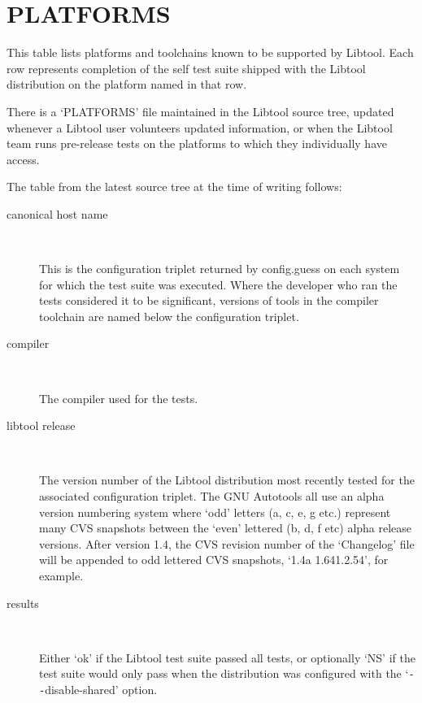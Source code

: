 \chapter{PLATFORMS}\label{platforms}

This table lists platforms and toolchains known to be supported by Libtool. Each row represents completion of the self test suite shipped with the Libtool distribution on the platform named in that row.

There is a `PLATFORMS' file maintained in the Libtool source tree, updated whenever a Libtool user volunteers updated information, or when the Libtool team runs pre-release tests on the platforms to which they individually have access.

The table from the latest source tree at the time of writing follows: 

\begin{description}
\item[canonical host name]
\

    This is the configuration triplet returned by config.guess on each system for which the test suite was executed. Where the developer who ran the tests considered it to be significant, versions of tools in the compiler toolchain are named below the configuration triplet.

\item[compiler]
\

    The compiler used for the tests.

\item[libtool release]
\

    The version number of the Libtool distribution most recently tested for the associated configuration triplet. The GNU Autotools all use an alpha version numbering system where `odd' letters (a, c, e, g etc.) represent many CVS snapshots between the `even' lettered (b, d, f etc) alpha release versions. After version 1.4, the CVS revision number of the `Changelog' file will be appended to odd lettered CVS snapshots, `1.4a 1.641.2.54', for example.

\item[results]
\

Either `ok' if the Libtool test suite passed all tests, or optionally `NS' 
if the test suite would only pass when the distribution was configured with 
the `\verb+--+disable-shared' option.
\end{description}

